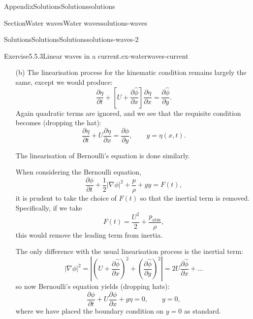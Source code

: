 \documentclass[oneside,10pt,]{book}
\numberwithin{equation}{section}
\newcommand{\pd}[2]{\frac{\partial#1}{\partial#2}}
\begin{document}
\begin{appendixptx}{Appendix}{Solutions}{}{Solutions}{}{}{solutions}
\begin{sectionptx}{Section}{Water waves}{}{Water waves}{}{}{solutions-waves}
\begin{solutions-subsection-numberless}{Solutions}{Solutions}{}{Solutions}{}{}{solutions-waves-2}
\begin{divisionsolution}{Exercise}{5.5.3}{Linear waves in a current.}{ex-waterwaves-current}
\begin{enumerate}[font=\bfseries,label=(\alph*),ref=\alph*]
\begin{equation*}
\phi \sim Ux, \qquad x \to -\infty.
\end{equation*}
%
\par
Indeed, this suggests that we should linearise about the uniform flow, with%
\begin{equation*}
\phi = Ux + \hat{\phi},
\end{equation*}
where \(\hat{\phi}\) is the approximation, which we expect to be small (as is standard in linear problems, we often ignore the hat notation).%
\item[(b)]\noindent\hypertarget{ex-waterwaves-current-4-2-main}{}The linearisation process for the kinematic condition remains largely the same, except we would produce:%
\begin{equation*}
\pd{\eta}{t} + \left[ U + \pd{\hat\phi}{x}\right] \pd{\eta}{x} = \pd{\hat{\phi}}{y}.
\end{equation*}
Again quadratic terms are ignored, and we see that the requisite condition becomes (dropping the hat):%
\begin{equation*}
\pd{\eta}{t} + U\pd{\eta}{x} = \pd{\phi}{y}, \qquad y = \eta(x, t).
\end{equation*}
%
\par
The linearisation of Bernoulli's equation is done similarly.%
\par
When considering the Bernoulli equation,%
\begin{equation*}
\pd{\phi}{t} + \frac{1}{2}|\nabla \phi|^2 + \frac{p}{\rho} + gy = F(t),
\end{equation*}
it is prudent to take the choice of \(F(t)\) so that the inertial term is removed. Specifically, if we take%
\begin{equation*}
F(t) = \frac{U^2}{2} + \frac{p_\text{atm}}{\rho}, 
\end{equation*}
this would remove the leading term from inertia.%
\par
The only difference with the usual linearisation process is the inertial term:%
\begin{equation*}
|\nabla \phi|^2 = \left\lvert \left(U + \pd{\hat{\phi}}{x}\right)^2 + \left(\pd{\hat{\phi}}{y}\right)^2 \right\rvert = 2U \pd{\hat\phi}{x} + \ldots
\end{equation*}
so now Bernoulli's equation yields (dropping hats):%
\begin{equation*}
\pd{\phi}{t} + U \pd{\phi}{x} + g\eta = 0, \qquad y = 0,
\end{equation*}
where we have placed the boundary condition on \(y = 0\) as standard.%

\end{enumerate}
\end{divisionsolution}
\end{solutions-subsection-numberless}
\end{sectionptx}
\end{appendixptx}
\end{document}
